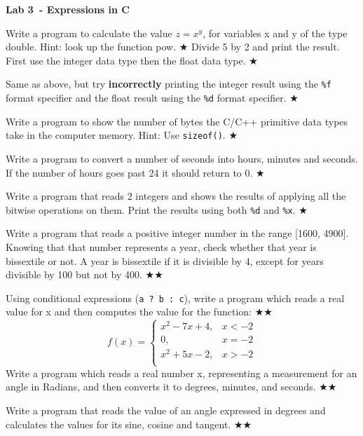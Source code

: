 \documentclass{exam}
\newcommand\labnr{3}
\newcommand\lab{Lab \labnr\ - Expressions in C}
\newcommand\lvlez{$\bigstar$}
\newcommand\lvlmed{\lvlez\lvlez}
\begin{document}
\begin{center}
   \vspace*{0cm}
   \bfseries\LARGE
   \lab
   \vspace*{1cm}
\end{center}


\begin{questions}
   \question Write a program to calculate the value $z=x^{y}$, for variables x and y of the type double.
   Hint: look up the function pow. \lvlez
   \question Divide 5 by 2 and print the result. First use the integer data type then the float data type. \lvlez

   \question Same as above, but try \textbf{incorrectly} printing the integer result using the \verb|%f| format specifier and the float result using the \verb|%d| format specifier. \lvlez

   \question Write a program to show the number of bytes the C/C++ primitive data types take in the computer memory. Hint: Use \verb|sizeof()|. \lvlez

   \question Write a program to convert a number of seconds into hours, minutes and seconds. If the number of hours goes past 24 it should return to 0. \lvlez

   \question Write a program that reads 2 integers and shows the results of applying all the bitwise operations on them. Print the results using both \verb|%d| and \verb|%x|. \lvlez

   \question Write a program that reads a positive integer number in the range [1600, 4900]. Knowing that that number represents a year, check whether that year is bissextile or not. A year is bissextile if it is divisible by 4, except for years divisible by 100 but not by 400. \lvlmed

   \question Using conditional expressions (\verb|a ? b : c|), write a program which reads a real value for
   x and then computes the
   value for the function: \lvlmed
   \[
      f(x)= \left\{
      \begin{array}{ll}
         x^2-7x+4, & x<-2 \\
         0,        & x=-2 \\
         x^2+5x-2, & x>-2 \\
      \end{array}
      \right.
   \]
   \question Write a program which reads a real number
x, representing a measurement for an angle in Radians,
and then converts it to degrees, minutes, and seconds. \lvlmed

   \question Write a program that reads the value of an angle expressed in degrees and calculates the values for its sine, cosine and tangent. \lvlmed


\end{questions}
\end{document}
